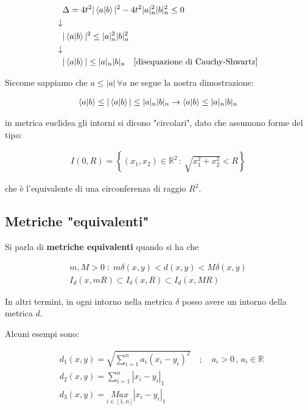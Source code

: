 \begin{align}
{}&\Delta = 4 t^2 |\braket{a|b}|^2 - 4t^2|a|^2_n |b|^2_n \leq 0 \nonumber \\
\downarrow \nonumber \\
&|\braket{a|b}|^2 \leq |a|^2_n |b|^2_n \nonumber \\
\downarrow \nonumber \\
& |\braket{a|b}| \leq |a|_n |b|_n \quad \text{[disequazione di Cauchy-Shwartz]}
\end{align}

Siccome sappiamo che $a \leq |a| \, \forall a$ ne segue la nostra dimostrazione:

\begin{align}
\braket{a|b} \leq |\braket{a|b}| \leq |a|_n |b|_n \rightarrow 
\braket{a|b} \leq |a|_n |b|_n
\end{align}

in metrica euclidea gli intorni si dicono "circolari", dato che assumono forme del tipo:

\begin{align}
I(0,R)= \left\{ (x_1,x_2)\in \mathbb{R}^2 \, : \, \sqrt{x_1^2 + x_2^2}<R \right\}
\end{align}

che è l'equivalente di una circonferenza di raggio $R^2$.

\subsection{Metriche "equivalenti"}

Si parla di \textbf{metriche equivalenti} quando si ha che

\begin{align}
m,M>0 \; : \; m\delta(x,y) <d(x,y) < M \delta(x,y) \\
I_d(x,mR) \subset I_\delta(x,R) \subset I_d (x,MR)
\end{align}

In altri termini, in ogni intorno nella metrica $\delta$ posso avere un intorno della metrica $d$.

\smallskip

Alcuni esempi sono:

\begin{align}
{}&d_1(x,y) = \sqrt{\sum_{i=1}^{n} a_i (x_i - y_i)^2} \quad ; \quad a_i > 0 \, , \, a_i \in \mathbb{R} \\
&d_2(x,y) = \sum_{i=1}^{n} |x_i - y_i|_1 \\
&d_3(x,y) = \underset{i \in [1,n]}{Max} |x_i - y_i|_1
\end{align}

